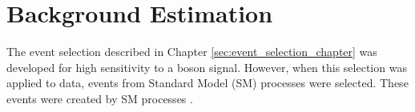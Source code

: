 \chapter{Background Estimation}
\label{sec:backgroundEstimation}
The event selection described in Chapter \ref{sec:event_selection_chapter} was developed for high 
sensitivity to a \WR boson signal.  However, when this selection was applied to data, events from 
Standard Model (SM) processes were selected.  These events were created by SM processes .

